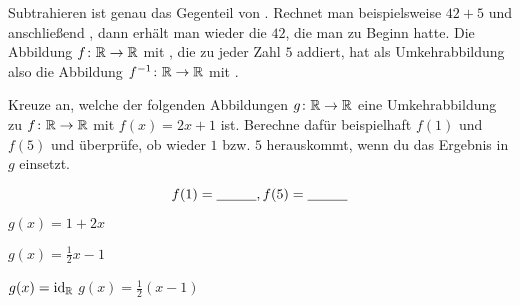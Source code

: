\documentclass[]{uebungsblatt}
\begin{document}
\begin{exercise}
    Subtrahieren ist genau das Gegenteil von . Rechnet man beispielsweise $42+5$ und  anschließend , dann erhält man wieder die $42$, die man zu Beginn hatte. Die Abbildung $f\colon\mathbb{R}\rightarrow\mathbb{R}$ mit , die zu jeder Zahl $5$ addiert, hat als Umkehrabbildung also die Abbildung $f^{-1}\colon\mathbb{R}\rightarrow\mathbb{R}$ mit .
\end{exercise}
\begin{exercise}
    Kreuze an, welche der folgenden Abbildungen $g\colon\mathbb{R}\rightarrow\mathbb{R}$ eine Umkehrabbildung zu $f\colon\mathbb{R}\rightarrow\mathbb{R}$ mit $f(x)=2x+1$ ist. Berechne dafür beispielhaft $f(1)$ und $f(5)$ und überprüfe, ob wieder $1$ bzw. $5$ herauskommt, wenn du das Ergebnis in $g$ einsetzt.
    
    \[f(1)=\answerfield{1cm}{3}, f(5)=\answerfield{1cm}{11}\]
    \begin{multiplechoice}
        \begin{multicols}{2}
        \item $g(x)=1+2x$
        \item $g(x)=\frac{1}{2}x-1$
        \item $g(x)=\ident[\Real]$
        \citem $g(x)=\frac{1}{2}(x-1)$
        \end{multicols}
    \end{multiplechoice}
\end{exercise}

\end{document}
